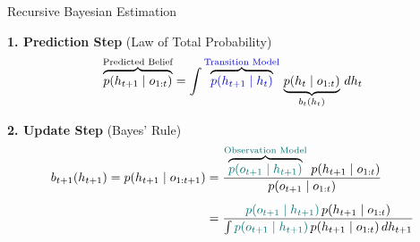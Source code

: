 \documentclass[18pt,aspectratio=149]{beamer}
\begin{document}
\begin{frame}{Recursive Bayesian Estimation}
    \centering

    \vspace{0.8em}

    \raggedright
    \textbf{1. Prediction Step} {\footnotesize (Law of Total Probability)}
    \[
        \overbrace{p(h_{t+1} \mid o_{1:t})}^{\text{Predicted Belief}} = \int \overbrace{\textcolor{blue!80!black}{p(h_{t+1} \mid h_t)}}^{\text{\textcolor{blue!80!black}{Transition Model}}} \, \underbrace{p(h_t \mid o_{1:t})}_{b_t(h_t)} \, dh_t
    \]

    \vspace{0.3em}

    \textbf{2. Update Step} {\footnotesize (Bayes' Rule)}
    \vspace{-1.8em}
    \begin{align*}
        b_{t+1}(h_{t+1}) = p(h_{t+1} \mid o_{1:t+1})
         & = \frac{\overbrace{\textcolor{teal!90!black}{p(o_{t+1} \mid h_{t+1})}}^{\text{\textcolor{teal!90!black}{Observation Model}}} \, p(h_{t+1} \mid o_{1:t})}{p(o_{t+1} \mid o_{1:t})} \\[0.5em]
         & = \frac{\textcolor{teal!90!black}{p(o_{t+1} \mid h_{t+1})} \, p(h_{t+1} \mid o_{1:t})}{\int \textcolor{teal!90!black}{p(o_{t+1} \mid h_{t+1})} \, p(h_{t+1} \mid o_{1:t}) \, dh_{t+1}}
    \end{align*}
\end{frame}
%
\end{document}
